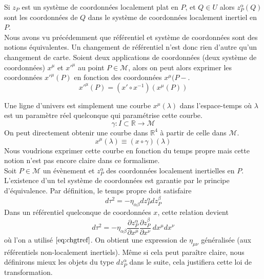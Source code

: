 \documentclass[a4paper,11pt]{report}
\theoremstyle{definition}
\theoremstyle{plain}
\theoremstyle{definition}
\theoremstyle{remark}
\newcommand{\M}{\mathscr{M}}
\newcommand{\p}{\partial}
\begin{document}
            Si $z_P$ est un système de coordonnées localement plat en $P$, et $Q\in U$ alors $z_P^\alpha(Q)$ sont les coordonnées de $Q$ dans le système de coordonnées localement inertiel en $P$.\\
            
            Nous avons vu précédemment que référentiel et système de coordonnées sont des notions équivalentes. Un changement de référentiel n'est donc rien d'autre qu'un changement de carte. Soient deux applications de coordonnées (deux système de coordonnées) $x^\mu$ et $x'^\mu$ au point $P\in\M$, alors on peut alors exprimer les coordonnées $x'^\mu(P)$ en fonction des coordonnées $x^\mu(P-$.
            \begin{equation}\label{eq:chgtref}
                x'^\mu(P) = (x'\circ x^{-1})(x^\mu(P))
            \end{equation}
            
            Une ligne d'univers est simplement une courbe $x^\mu(\lambda)$ dans l'espace-temps où $\lambda$ est un paramètre réel quelconque qui paramétrise cette courbe.
            \begin{equation}
                \gamma : I\subset\mathbb{R} \to \M
            \end{equation}
            On peut directement obtenir une courbe dans $\mathbb{R}^4$ à partir de celle dans $\mathcal{M}$.
            \begin{equation}
                x^\mu(\lambda)\equiv(x\circ\gamma)(\lambda)
            \end{equation}
            Nous voudrions exprimer cette courbe en fonction du temps propre mais cette notion n'est pas encore claire dans ce formalisme.\\
            
            Soit $P\in\M$ un évènement et $z^\alpha_P$ des coordonnées localement inertielles en $P$. L'existence d'un tel système de coordonnées est garantie par le principe d'équivalence. Par définition, le temps propre doit satisfaire
            \begin{equation}
                d\tau^2 = -\eta_{\alpha\beta}dz^\alpha_Pdz^\beta_P
            \end{equation}
            Dans un référentiel quelconque de coordonnées $x$, cette relation devient
            \begin{equation}\label{eq:met}
                d\tau^2 = -\eta_{\alpha\beta}\frac{\p z^\alpha_P}{\p x^\mu}\frac{\p z^\beta_P}{\p x^\nu}~dx^\mu dx^\nu
            \end{equation}
            où l'on a utilisé $\ref{eq:chgtref}$. On obtient une expression de $\eta_{\mu\nu}$ généralisée (aux référentiels non-localement inertiels). Même si cela peut paraître claire, nous définirons mieux les objets du type $dz^\alpha_P$ dans le suite, cela justifiera cette loi de transformation.
            
\end{document}
